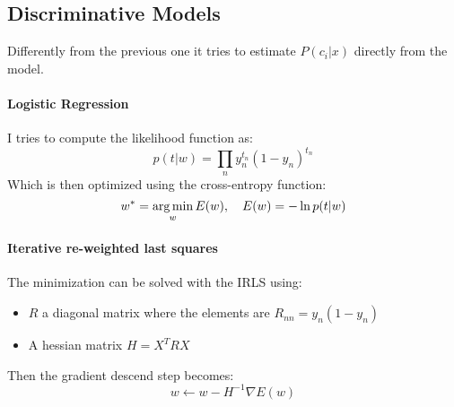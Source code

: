 \subsection{Discriminative Models}
Differently from the previous one it tries to estimate $P(c_i|x)$ directly from the model.

\paragraph{Logistic Regression}
I tries to compute the likelihood function as:
$$p(t|w)=\prod_n y_n^{t_n}(1-y_n)^{t_n}$$
Which is then optimized using the cross-entropy function:
$$w^*=\operatorname*{arg\,min}_w E(w),\quad E(w)=-\ln p(t|w)$$

\paragraph{Iterative re-weighted last squares}
The minimization can be solved with the IRLS using:
\begin{itemize}
\item $R$ a diagonal matrix where the elements are $R_{nn}=y_n(1-y_n)$
\item A hessian matrix $H=X^TRX$
\end{itemize}
Then the gradient descend step becomes:
$$w \leftarrow w-H^{-1}\nabla E(w)$$